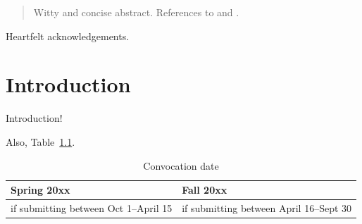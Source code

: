\documentclass[12pt,openany,oneside]{report}
\begin{document}

\doublespacing

\newpage
\begin{abstract}
  Witty and concise abstract.  References to \cite{MathStats38} and
  \cite{Physicist38}.
\end{abstract}


\begin{acknowledgement}
  Heartfelt acknowledgements.
\end{acknowledgement}



\tableofcontents

\listoftables

\listoffigures


\beginbodyoftex



\chapter{Introduction}

Introduction!

Also, Table~\ref{egtable}.

\begin{table}[htbp]
  \begin{center}
    \begin{tabular}{|p{4cm}|p{4cm}|}
      \hline
      Spring 20xx & Fall 20xx \\
      \hline
      \hline
      if submitting between Oct 1--April 15
      & if submitting between April 16--Sept 30\\
      \hline
    \end{tabular}
    \caption{Convocation date}
    \label{egtable}
  \end{center}
\end{table}
\end{document}
